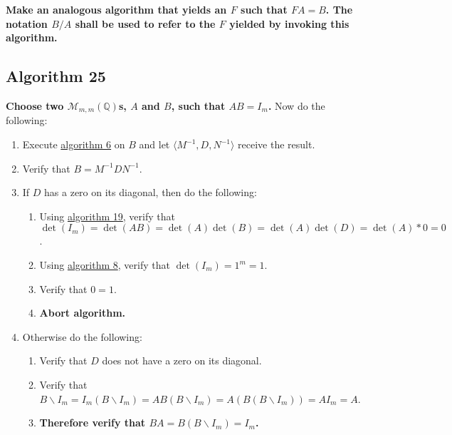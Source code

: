 \documentclass[twocolumn]{article}
\begin{document}
			\textbf{Make an analogous algorithm that yields an $F$ such that $FA=B$. The notation $B/A$ shall be used to refer to the $F$ yielded by invoking this algorithm.}
		\subsection{Algorithm 25}\label{sec:algorithm 25}
			\textbf{Choose two $\mathcal{M}_{m,m}(\mathbb{Q})$s, $A$ and $B$, such that $AB=I_m$.} Now do the following:
			\begin{enumerate}
				\item Execute \hyperref[sec:algorithm 6]{algorithm 6} on $B$ and let $\langle M^{-1},D,N^{-1}\rangle$ receive the result.
				\item Verify that $B=M^{-1}DN^{-1}$.
				\item If $D$ has a zero on its diagonal, then do the following:
				\begin{enumerate}
					\item Using \hyperref[sec:algorithm 19]{algorithm 19}, verify that $\det(I_m)=\det(AB)=\det(A)\det(B)=\det(A)\det(D)=\det(A)*0=0$.
					\item Using \hyperref[sec:algorithm 8]{algorithm 8}, verify that $\det(I_m)=1^m=1$.
					\item Verify that $0=1$.
					\item \textbf{Abort algorithm.}
				\end{enumerate}
				\item Otherwise do the following:
				\begin{enumerate}
					\item Verify that $D$ does not have a zero on its diagonal.
					\item Verify that $B\backslash I_m=I_m(B\backslash I_m)=AB(B\backslash I_m)=A(B(B\backslash I_m))=AI_m=A$.
					\item \textbf{Therefore verify that $BA=B(B\backslash I_m)=I_m$.}
				\end{enumerate}
			\end{enumerate}
\end{document}
